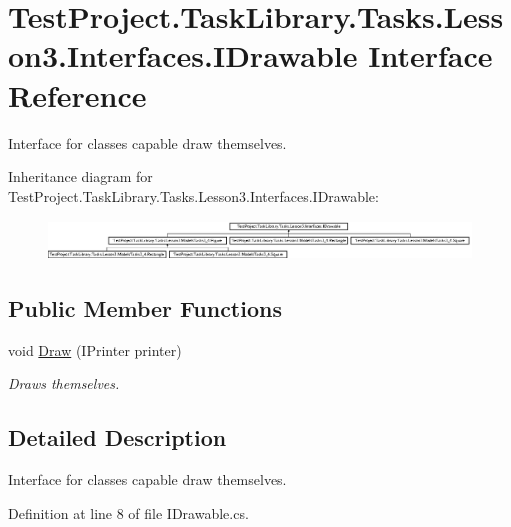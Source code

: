 \hypertarget{interface_test_project_1_1_task_library_1_1_tasks_1_1_lesson3_1_1_interfaces_1_1_i_drawable}{}\section{Test\+Project.\+Task\+Library.\+Tasks.\+Lesson3.\+Interfaces.\+I\+Drawable Interface Reference}
\label{interface_test_project_1_1_task_library_1_1_tasks_1_1_lesson3_1_1_interfaces_1_1_i_drawable}


Interface for classes capable draw themselves.  


Inheritance diagram for Test\+Project.\+Task\+Library.\+Tasks.\+Lesson3.\+Interfaces.\+I\+Drawable\+:\begin{figure}[H]
\begin{center}
\leavevmode
\includegraphics[height=1.052631cm]{interface_test_project_1_1_task_library_1_1_tasks_1_1_lesson3_1_1_interfaces_1_1_i_drawable}
\end{center}
\end{figure}
\subsection*{Public Member Functions}
\begin{DoxyCompactItemize}
\item 
void \mbox{\hyperlink{interface_test_project_1_1_task_library_1_1_tasks_1_1_lesson3_1_1_interfaces_1_1_i_drawable_a42d4b370fc36d2f695e312d7780c05d6}{Draw}} (I\+Printer printer)
\begin{DoxyCompactList}\small\item\em Draws themselves. \end{DoxyCompactList}\end{DoxyCompactItemize}


\subsection{Detailed Description}
Interface for classes capable draw themselves. 



Definition at line 8 of file I\+Drawable.\+cs.



